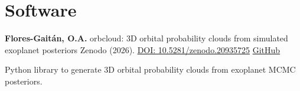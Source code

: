 \section{Software}

\begin{onecolentry}
\begin{etaremune}
    \resumePubEntry
        {\textbf{Flores-Gaitán, O.A.}}
        {orbcloud: 3D orbital probability clouds from simulated exoplanet posteriors}
        {Zenodo (2026). \href{https://doi.org/10.5281/zenodo.20935725}{DOI: 10.5281/zenodo.20935725} \kern 0.2cm \href{https://github.com/oscarfloresgaitan/orbcloud}{GitHub}}
\end{etaremune}
\vspace{0.05cm}
\begin{highlights}
    \item Python library to generate 3D orbital probability clouds from exoplanet MCMC posteriors.
\end{highlights}
\end{onecolentry}
